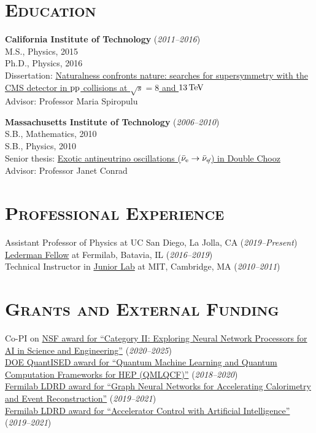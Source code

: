 \documentclass[12pt]{res}
\newcommand{\MarginText}[1]{\section{\textsc{#1}}\vspace{10pt}}
\begin{document}
\begin{resume}


\MarginText{Education}

\textbf{California Institute of Technology} (\textit{2011--2016})\\
M.S., Physics, 2015\\
Ph.D., Physics, 2016\\
Dissertation:
    \href{http://resolver.caltech.edu/CaltechTHESIS:08232016-112522351}{Naturalness
        confronts nature: searches for supersymmetry with the CMS
        detector in $\mathrm{p}\mathrm{p}$ collisions at $\sqrt{s} = 8$ and $13\,\text{Te\hspace{-.08em}V}$}\\
Advisor: Professor Maria Spiropulu

\textbf{Massachusetts Institute of Technology} (\textit{2006--2010})\\
S.B., Mathematics, 2010\\
S.B., Physics, 2010\\
Senior thesis: \href{http://hdl.handle.net/1721.1/61255}{Exotic antineutrino oscillations
  ($\bar\nu_\Pe\to\bar\nu_{\slashed{\Pe}}$) in Double Chooz}\\
Advisor: Professor Janet Conrad



\MarginText{Professional Experience}
Assistant Professor of Physics at UC San Diego, La Jolla, CA (\textit{2019--Present})\\
\href{http://www.fnal.gov/pub/forphysicists/fellowships/leon_lederman/index.html}{Lederman
  Fellow} at Fermilab, Batavia, IL (\textit{2016--2019})\\
Technical Instructor in
\href{http://web.mit.edu/8.13/www/index.shtml}{Junior Lab} at MIT, Cambridge, MA (\textit{2010--2011})


\MarginText{Grants and External Funding}
Co-PI on \href{https://nsf.gov/awardsearch/showAward?AWD_ID=2005369}{NSF award for ``Category II: Exploring Neural Network Processors for AI in Science and Engineering''} (\textit{2020--2025})\\
\href{https://pamspublic.science.energy.gov/WebPAMSExternal/Interface/Common/ViewPublicAbstract.aspx?rv=1f7d4729-6f93-40bd-a55f-c108545b1ea9&rtc=24&PRoleId=10}{DOE QuantISED award for ``Quantum Machine Learning and Quantum Computation Frameworks for HEP (QMLQCF)''} (\textit{2018--2020})\\
\href{https://ldrd.fnal.gov/subdir/FNAL-LDRD-2019-017-D1.pdf}{Fermilab LDRD award for ``Graph Neural Networks for Accelerating Calorimetry and Event Reconstruction''} (\textit{2019--2021})\\
\href{https://ldrd.fnal.gov/subdir/FNAL-LDRD-2019-027-D1.pdf}{Fermilab LDRD award for ``Accelerator Control with Artificial Intelligence''} (\textit{2019--2021})\\



\end{resume}
\end{document}

